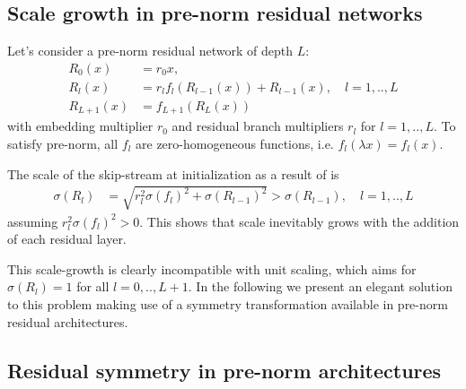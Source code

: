 \subsection{Scale growth in pre-norm residual networks}

Let's consider a pre-norm residual network of depth $L$:
\begin{align}
    R_0(x) &= r_0 x, \label{eq:resnet_a}
    \\
    R_{l}(x) &= r_{l}f_l(R_{l-1}(x)) + R_{l-1}(x), \quad l=1,..,L \label{eq:resnet_b}
    \\
    R_{L+1}(x) &= f_{L+1}(R_L(x)) \label{eq:resnet_c}
\end{align}
with embedding multiplier $r_0$ and residual branch multipliers $r_l$ for $l=1,..,L$. To satisfy pre-norm, all $f_l$ are zero-homogeneous functions, i.e. $f_l(\lambda x) = f_l(x)$.

The scale of the skip-stream at initialization as a result of  is
\begin{align}
    \sigma(R_l) &= \sqrt{r_l^2 \sigma(f_l)^2 + \sigma(R_{l-1})^2}
    > \sigma(R_{l-1}), \quad l=1,..,L
    \label{eq:residual_non_unit_scale}
\end{align}
assuming $r_l^2 \sigma(f_l)^2 > 0$. This shows that scale inevitably grows with the addition of each residual layer.

This scale-growth is clearly incompatible with unit scaling, which aims for $\sigma(R_l) = 1$ for all $l=0,..,L+1$.
In the following we present an elegant solution to this problem making use of a symmetry transformation available in pre-norm residual architectures.

\subsection{Residual symmetry in pre-norm architectures}

